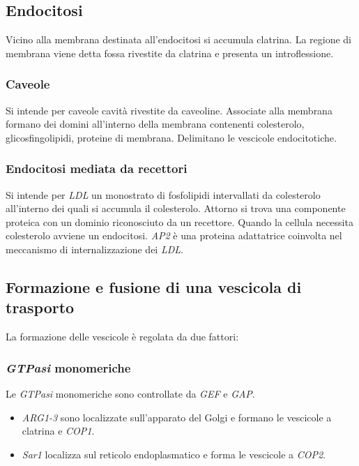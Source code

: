 	\subsection{Endocitosi}
	Vicino alla membrana destinata all'endocitosi si accumula clatrina.
	La regione di membrana viene detta fossa rivestite da clatrina e presenta un introflessione.

		\subsubsection{Caveole}
		Si intende per caveole cavit\`a rivestite da caveoline.
		Associate alla membrana formano dei domini all'interno della membrana contenenti colesterolo, glicosfingolipidi, proteine di membrana.
		Delimitano le vescicole endocitotiche.

		\subsubsection{Endocitosi mediata da recettori}
		Si intende per \emph{LDL} un monostrato di fosfolipidi intervallati da colesterolo all'interno dei quali si accumula il colesterolo.
		Attorno si trova una componente proteica con un dominio riconosciuto da un recettore.
		Quando la cellula necessita colesterolo avviene un endocitosi.
		\emph{AP2} \`e una proteina adattatrice coinvolta nel meccanismo di internalizzazione dei \emph{LDL}.

	\subsection{Formazione e fusione di una vescicola di trasporto}
	La formazione delle vescicole \`e regolata da due fattori:
	
		\subsubsection{\emph{GTPasi} monomeriche}
		Le \emph{GTPasi} monomeriche sono controllate da \emph{GEF} e \emph{GAP}.
		\begin{multicols}{2}
			\begin{itemize}
				\item \emph{ARG1-3} sono localizzate sull'apparato del Golgi e formano le vescicole a clatrina e \emph{COP1}.
				\item \emph{Sar1} localizza sul reticolo endoplasmatico e forma le vescicole a \emph{COP2}.
			\end{itemize}
		\end{multicols}


